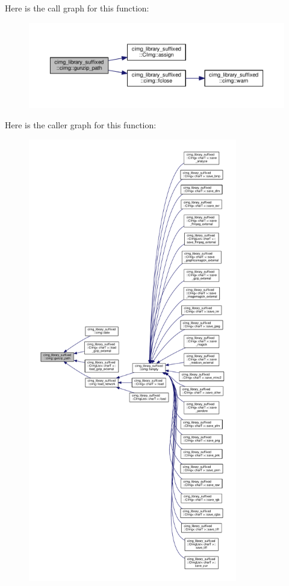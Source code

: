 Here is the call graph for this function\+:
\nopagebreak
\begin{figure}[H]
\begin{center}
\leavevmode
\includegraphics[width=350pt]{d4/d9b/namespacecimg__library__suffixed_1_1cimg_a7b4390d7bec2ffbf27d108f1c3a699e0_cgraph}
\end{center}
\end{figure}
Here is the caller graph for this function\+:
\nopagebreak
\begin{figure}[H]
\begin{center}
\leavevmode
\includegraphics[height=550pt]{d4/d9b/namespacecimg__library__suffixed_1_1cimg_a7b4390d7bec2ffbf27d108f1c3a699e0_icgraph}
\end{center}
\end{figure}
\mbox{\label{namespacecimg__library__suffixed_1_1cimg_aac00308d827ccbd69bd26c9ba6e1356b}} 
